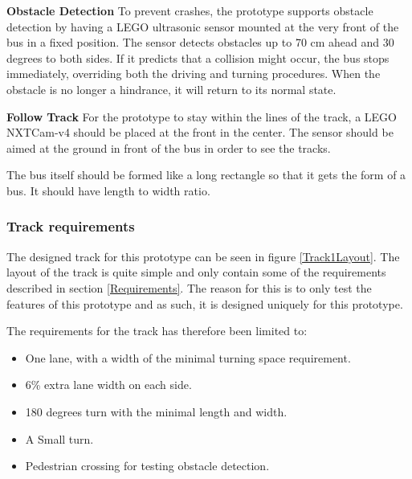\textbf{Obstacle Detection}\newline
To prevent crashes, the prototype supports obstacle detection by having a LEGO ultrasonic sensor mounted at the very front of the bus in a fixed position. The sensor detects obstacles up to 70 cm ahead and 30 degrees to both sides. If it predicts that a collision might occur, the bus stops immediately, overriding both the driving and turning procedures. When the obstacle is no longer a hindrance, it will return to its normal state.  %

\textbf{Follow Track}\newline
For the prototype to stay within the lines of the track, a LEGO NXTCam-v4 should be placed at the front in the center. The sensor should be aimed at the ground in front of the bus in order to see the tracks.

The bus itself should be formed like a long rectangle so that it gets the form of a bus. It should have  length to width ratio.

\subsubsection{Track requirements}
The designed track for this prototype can be seen in figure \ref{Track1Layout}. The layout of the track is quite simple and only contain some of the requirements described in section \ref{Requirements}. The reason for this is to only test the features of this prototype and as such, it is designed uniquely for this prototype.

The requirements for the track has therefore been limited to:
\cite{DriveingCurves}
\begin{itemize}
  \item One lane, with a width of the minimal turning space requirement.
  \item 6\% extra lane width on each side.
  \item 180 degrees turn with the minimal length and width.
  \item A Small turn.
  \item Pedestrian crossing for testing obstacle detection.
\end{itemize}

